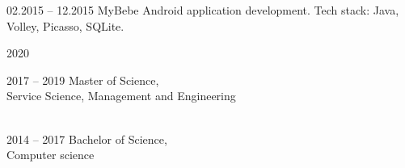 \documentclass[12pt, a4paper]{article}
\newcommand{\midSectionSpace}{16pt}
\begin{document}
\begin{minipage}[t]{0.6\textwidth}
    \vspace{\midSectionSpace}
    
    \begin{subsec}{}{02.2015 – 12.2015}
        \> MyBebe Android application development. \lineend
        \> Tech stack: Java, Volley, Picasso, SQLite. \\
    \end{subsec}
    
    \vspace{24pt}
    
    
    \vspace{24pt}
    
    \begin{subsec}{}{2020}
        \>  \\
    \end{subsec}
    
    \vspace{\midSectionSpace}
    
    \begin{subsec}{}{2017 – 2019}
        \> Master of Science,  \\
        \> Service Science, Management and Engineering \\
        \>  \\
    \end{subsec}
    
    \vspace{\midSectionSpace}
    
    \begin{subsec}{}{2014 – 2017}
        \> Bachelor of Science,  \\
        \> Computer science \\
    \end{subsec}
\end{minipage}
\end{document}
